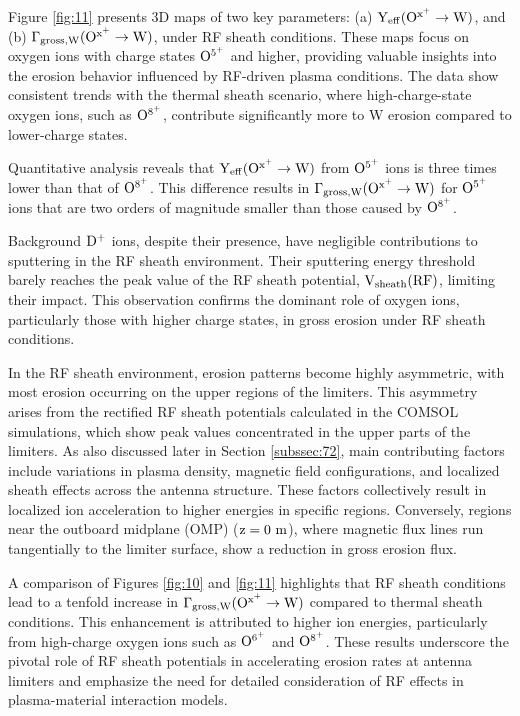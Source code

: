 \documentclass[10pt]{iopart}
\begin{document}
Figure \ref{fig:11} presents 3D maps of two key parameters: (a) $\rm Y_{{eff}}(O^{x^+} \rightarrow W)$, and (b) $\rm \Gamma_{{gross, W}}(O^{x^+} \rightarrow W)$, under RF sheath conditions. These maps focus on oxygen ions with charge states $\rm O^{5^+}$ and higher, providing valuable insights into the erosion behavior influenced by RF-driven plasma conditions. The data show consistent trends with the thermal sheath scenario, where high-charge-state oxygen ions, such as $\rm O^{8^+}$, contribute significantly more to W erosion compared to lower-charge states.

Quantitative analysis reveals that $\rm  Y_{{eff}}(O^{x^+} \rightarrow W)$ from $\rm O^{5^+}$ ions is three times lower than that of $\rm O^{8^+}$. This difference results in $\rm \Gamma_{{gross, W}}(O^{x^+} \rightarrow W)$ for $\rm O^{5^+}$ ions that are two orders of magnitude smaller than those caused by $\rm O^{8^+}$. 

Background $\rm D^+$ ions, despite their presence, have negligible contributions to sputtering in the RF sheath environment. Their sputtering energy threshold barely reaches the peak value of the RF sheath potential, $\rm V_{sheath}(RF)$, limiting their impact. This observation confirms the dominant role of oxygen ions, particularly those with higher charge states, in gross erosion under RF sheath conditions.

In the RF sheath environment, erosion patterns become highly asymmetric, with most erosion occurring on the upper regions of the limiters. This asymmetry arises from the rectified RF sheath potentials calculated in the COMSOL simulations, which show peak values concentrated in the upper parts of the limiters. As also discussed later in Section \ref{subssec:72}, main contributing factors include variations in plasma density, magnetic field configurations, and localized sheath effects across the antenna structure. These factors collectively result in localized ion acceleration to higher energies in specific regions. Conversely, regions near the outboard midplane (OMP) ($\rm z=0~m$), where magnetic flux lines run tangentially to the limiter surface, show a reduction in gross erosion flux.

A comparison of Figures \ref{fig:10} and \ref{fig:11} highlights that RF sheath conditions lead to a tenfold increase in $\rm \Gamma_{{gross, W}}(O^{x^+} \rightarrow W)$ compared to thermal sheath conditions. This enhancement is attributed to higher ion energies, particularly from high-charge oxygen ions such as \( \rm O^{6^+} \) and \( \rm O^{8^+} \). These results underscore the pivotal role of RF sheath potentials in accelerating erosion rates at antenna limiters and emphasize the need for detailed consideration of RF effects in plasma-material interaction models.
\end{document}
